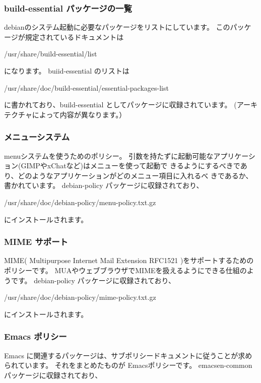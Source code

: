 \documentclass[mingoth,a4paper]{jsarticle}
\begin{document}
    \subsubsection{build-essential パッケージの一覧}
        debianのシステム起動に必要なパッケージをリストにしています。
        このパッケージが規定されているドキュメントは

        /usr/share/build-essential/list
 
        になります。
        buiid-essential のリストは

        /usr/share/doc/build-essential/essential-packages-list

        に書かれており、build-essential としてパッケージに収録されています。
        (アーキテクチャによって内容が異なります。）

    \subsubsection{メニューシステム}
        menuシステムを使うためのポリシー。
        引数を持たずに起動可能なアプリケーション(GIMPやxChatなど)はメニューを使って起動で
        きるようにするべきであり、どのようなアプリケーションがどのメニュー項目に入れるべ
        きであるか、書かれています。
        debian-policy パッケージに収録されており、

        /usr/share/doc/debian-policy/menu-policy.txt.gz

        にインストールされます。

    \subsubsection{MIME サポート}
        MIME( Multipurpose Internet Mail Extension RFC1521 )をサポートするためのポリシーです。
        MUAやウェブブラウザでMIMEを扱えるようにできる仕組のようです。
        debian-policy パッケージに収録されており、

        /usr/share/doc/debian-policy/mime-policy.txt.gz

        にインストールされます。

    \subsubsection{Emacs ポリシー}
        Emacs に関連するパッケージは、サブポリシードキュメントに従うことが求められています。
        それをまとめたものが Emacsポリシーです。
        emacsen-common パッケージに収録されており、
\end{document}
